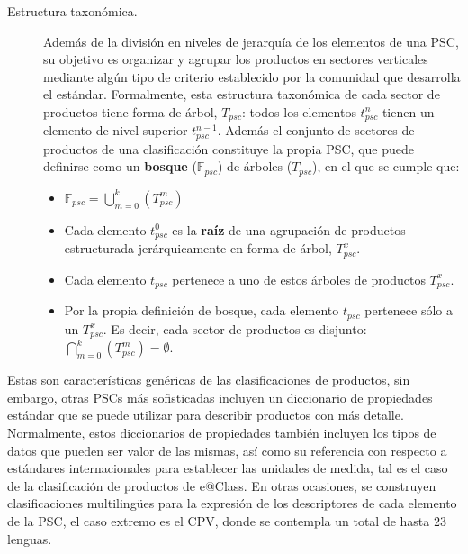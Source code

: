 \begin{description}
\item  [Estructura taxonómica.] Además de la división en niveles de jerarquía
de los elementos de una \gls{PSC}, su objetivo es organizar y agrupar los productos en
sectores verticales mediante algún tipo de criterio establecido por la comunidad
que desarrolla el estándar. Formalmente, esta estructura taxonómica de cada
sector de productos tiene forma de árbol, $T_{psc}$: todos los elementos
$t_{psc}^n$ tienen un elemento de nivel superior $t_{psc}^{n-1}$. Además el
conjunto de sectores de productos de una clasificación constituye la propia PSC,
que puede definirse como un \textbf{bosque} ($\mathbb{F}_{psc}$) de árboles
($T_{psc}$), en el que se cumple que:
\begin{itemize}
 \item $\mathbb{F}_{psc}= \displaystyle\bigcup_{m=0}^k{(T_{psc}^m)}$
 \item Cada elemento $t_{psc}^0$ es la \textbf{raíz} de una agrupación de
productos estructurada jerárquicamente en forma de árbol, $T_{psc}^x$.
 \item Cada elemento $t_{psc}$ pertenece a uno de estos árboles de productos
$T_{psc}^x$.
 \item Por la propia definición de bosque, cada elemento $t_{psc}$ pertenece sólo
a un $T_{psc}^x$. Es decir, cada sector de productos es disjunto:
$\displaystyle\bigcap_{m=0}^k{(T_{psc}^m)}=\emptyset$.
\end{itemize}
 
\end{description}

Estas son características genéricas de las clasificaciones de productos, sin
embargo, otras PSCs más sofisticadas incluyen un diccionario de propiedades
estándar que se puede utilizar para describir productos con más detalle.
Normalmente, estos diccionarios de propiedades también incluyen los tipos de
datos que pueden ser valor de las mismas, así como su referencia con respecto
a estándares internacionales para establecer las unidades de medida, tal es el caso
de la clasificación de productos de e@Class. En otras ocasiones, se construyen
clasificaciones multiling\"{u}es para la expresión de los descriptores de cada
elemento de la PSC, el caso extremo es el \gls{CPV}, donde se contempla un total de hasta $23$ lenguas.

